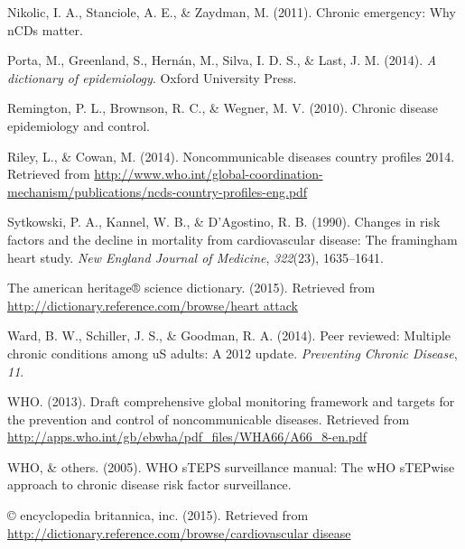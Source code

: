 Nikolic, I. A., Stanciole, A. E., \& Zaydman, M. (2011). Chronic
emergency: Why nCDs matter.

Porta, M., Greenland, S., Hern{á}n, M., Silva, I. D. S., \& Last, J. M.
(2014). \emph{A dictionary of epidemiology}. Oxford University Press.

Remington, P. L., Brownson, R. C., \& Wegner, M. V. (2010). Chronic
disease epidemiology and control.

Riley, L., \& Cowan, M. (2014). Noncommunicable diseases country
profiles 2014. Retrieved from
\url{http://www.who.int/global-coordination-mechanism/publications/ncds-country-profiles-eng.pdf}

Sytkowski, P. A., Kannel, W. B., \& D'Agostino, R. B. (1990). Changes in
risk factors and the decline in mortality from cardiovascular disease:
The framingham heart study. \emph{New England Journal of Medicine},
\emph{322}(23), 1635--1641.

The american heritage® science dictionary. (2015). Retrieved from
\href{http://dictionary.reference.com/browse/heart attack}{http://dictionary.reference.com/browse/heart attack}

Ward, B. W., Schiller, J. S., \& Goodman, R. A. (2014). Peer reviewed:
Multiple chronic conditions among uS adults: A 2012 update.
\emph{Preventing Chronic Disease}, \emph{11}.

WHO. (2013). Draft comprehensive global monitoring framework and targets
for the prevention and control of noncommunicable diseases. Retrieved
from \url{http://apps.who.int/gb/ebwha/pdf_files/WHA66/A66_8-en.pdf}

WHO, \& others. (2005). WHO sTEPS surveillance manual: The wHO sTEPwise
approach to chronic disease risk factor surveillance.

© encyclopedia britannica, inc. (2015). Retrieved from
\href{http://dictionary.reference.com/browse/cardiovascular disease}{http://dictionary.reference.com/browse/cardiovascular disease}
